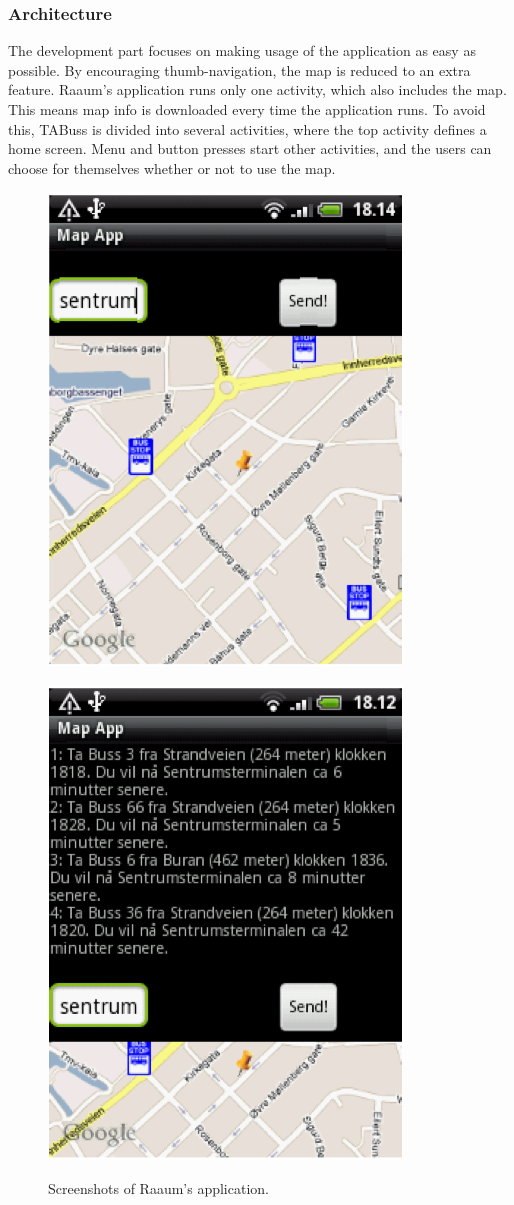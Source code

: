 \subsubsection{Architecture}
The development part focuses on making usage of the application as easy as possible. By encouraging thumb-navigation, the map is reduced to an extra feature. Raaum's application runs only one activity, which also includes the map. This means map info is downloaded every time the application runs. To avoid this, TABuss is divided into several activities, where the top activity defines a home screen. Menu and button presses start other activities, and the users can choose for themselves whether or not to use the map.

\vspace{0.5cm}
\begin{figure}[ht]
\begin{minipage}[b]{0.5\linewidth}
\centering
\includegraphics[width=0.5\linewidth]{Method/magnus1.png}
\label{fig:figure1}
\end{minipage}
\hspace{0.2cm}
\begin{minipage}[b]{0.5\linewidth}
\centering
\includegraphics[width=0.5\linewidth]{Method/magnus2.png}
\label{fig:figure2}
\end{minipage}
\caption{Screenshots of Raaum's application.}
\end{figure}

